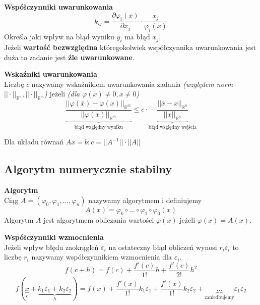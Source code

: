 \documentclass[../mn-notatki.tex]{subfiles}
\begin{document}
\begin{tcolorbox}
\textbf{Współczynniki uwarunkowania}\\
\[
k_{ij} = \frac{\partial \varphi_i(x)}{\partial x_j} \cdot \frac{x_j}{\varphi_i(x)}
\]
    Określa jaki wpływ na błąd wyniku $y_i$ ma błąd $x_j$.\\
     Jeżeli \textbf{wartość bezwzględna} któregokolwiek współczynnika
uwarunkowania jest duża to zadanie jest \textbf{źle uwarunkowane}.

\end{tcolorbox}

\begin{tcolorbox}
\textbf{Wskaźniki uwarunkowania}\\
Liczbę $c$ nazywamy wskaźnikiem uwarunkowania zadania
\textit{(względem norm $||\cdot||_{\mathbb{R}^n}, ||\cdot||_{\mathbb{R}^m}$)}
jeżeli \textit{(dla $\varphi(x) \neq 0, x \neq 0$)}
\[
\underbrace{\frac{||\varphi(\bar{x}) - \varphi(x)||_{\mathbb{R}^m}}{||\varphi(x)||_{\mathbb{R}^m}}}_{\text{błąd względny wyniku}}
\leqslant
c  \cdot
\underbrace{\frac{||\bar{x} - x||_{\mathbb{R}^n}}{||x||_{\mathbb{R}^n}}}_{\text{błąd względny wejścia}}
\]

Dla układu równań
$Ax = b :
c = || A^{−1}|| \cdot ||A||$
\end{tcolorbox}

\subsection{Algorytm numerycznie stabilny}

\begin{tcolorbox}
\textbf{Algorytm}\\
Ciąg $A = (\varphi_0, \varphi_1, \ldots, \varphi_n)$ nazywamy algorytmem i definiujemy
\[
A(x) = \varphi_k \circ \ldots \circ \varphi_1 \circ \varphi_0(x)
\]
Algorytm $A$ jest algorytmem obliczania wartości $\varphi(x)$ jeżeli
$\varphi(x) = A(x)$.
\end{tcolorbox}

\begin{tcolorbox}
\textbf{Współczynniki wzmocnienia}\\
Jeżeli wpływ błędu zaokrągleń $\varepsilon_i$ na ostateczny błąd obliczeń
wynosi $r_i \varepsilon_i$ to liczbę $r_i$ nazywamy współczynnikiem wzmocnienia
dla $\varepsilon_i$.
\[
f(c + h) =
f(c) +
\frac{f'(c)}{1!} h +
\frac{f'(c)}{2!} h^2
\]
\[
f(\underbrace{x}_{c} + \underbrace{k_1 \varepsilon_1 + k_2 \varepsilon_2}_h) =
f(x) +
\frac{f'(x)}{1!} k_1 \varepsilon_1 +
\frac{f'(x)}{1!} k_2 \varepsilon_2 +
\underbrace{\ldots}_{\text{zaniedbujemy}} \varepsilon_1 \varepsilon_2
\]
\end{tcolorbox}
\end{document}
